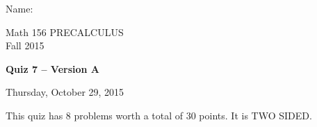 \documentclass[11pt]{article}
\begin{document}

{\huge{Name:{\underline{\hspace{4in}}}}}
\vfill

\begin{center}
\vspace{1in}

\huge{Math 156 PRECALCULUS \\
Fall 2015}

\vfill

\huge{\bf{Quiz 7 -- Version A}}\\

\vspace{0.5in}

\large{Thursday, October 29, 2015}\\

\vfill

This quiz has 8 problems worth a total of 30 points. It is TWO SIDED. 
\vfill
\end{center}


\vfill
\end{document}
